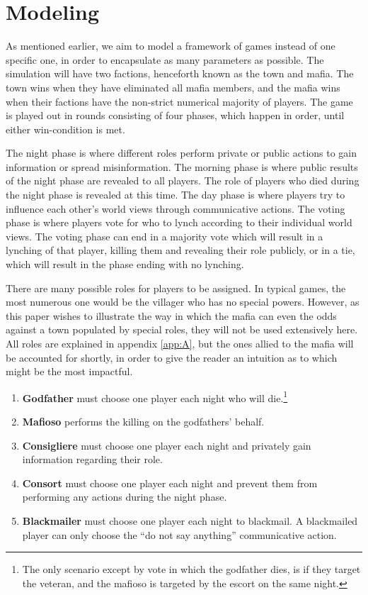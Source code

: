 \section{Modeling}
As mentioned earlier, we aim to model a framework of games instead of one
specific one, in order to encapsulate as many parameters as possible. The
simulation will have two factions, henceforth known as the town and mafia. The
town wins when they have eliminated all mafia members, and the mafia wins when
their factions have the non-strict numerical majority of players. The game is
played out in rounds consisting of four phases, which happen in order, until
either win-condition is met.

The night phase is where different roles perform private or public actions to
gain information or spread misinformation. The morning phase is where public
results of the night phase are revealed to all players. The role of players who
died during the night phase is revealed at this time. The day phase is where
players try to influence each other's world views through communicative
actions. The voting phase is where players vote for who to lynch according to
their individual world views. The voting phase can end in a majority vote which
will result in a lynching of that player, killing them and revealing their role
publicly, or in a tie, which will result in the phase ending with no lynching.

There are many possible roles for players to be assigned. In typical games, the
most numerous one would be the villager who has no special powers. However, as
this paper wishes to illustrate the way in which the mafia can even the odds
against a town populated by special roles, they will not be used extensively
here. All roles are explained in appendix \ref{app:A}, but the ones allied to
the mafia will be accounted for shortly, in order to give
the reader an intuition as to which might be the most impactful.

\begin{enumerate}
	\item\textbf{Godfather} must choose one player each night who will die.\footnote{The only scenario except by vote in which the godfather dies, is if they target the veteran, and the mafioso is targeted by the escort on the same night.}
	\item\textbf{Mafioso} performs the killing on the godfathers' behalf.
	\item\textbf{Consigliere} must choose one player each night and privately
	      gain information regarding their role.
	\item\textbf{Consort} must choose one player each night and prevent them
	      from performing any actions during the night phase.
	\item\textbf{Blackmailer} must choose one player each night to blackmail. A
	      blackmailed player can only choose the “do not say anything” communicative
	      action.
\end{enumerate}


